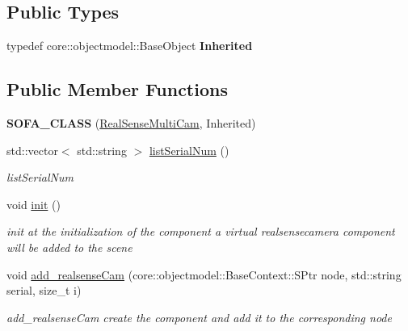 \subsection*{Public Types}
\begin{DoxyCompactItemize}
\item 
\mbox{\label{classsofa_1_1rgbdtracking_1_1_real_sense_multi_cam_ac46918355916b1af92c7aabc7e244e39}} 
typedef core\+::objectmodel\+::\+Base\+Object {\bfseries Inherited}
\end{DoxyCompactItemize}
\subsection*{Public Member Functions}
\begin{DoxyCompactItemize}
\item 
\mbox{\label{classsofa_1_1rgbdtracking_1_1_real_sense_multi_cam_a580a759696c9de476a75c1aabc955669}} 
{\bfseries S\+O\+F\+A\+\_\+\+C\+L\+A\+SS} (\hyperlink{classsofa_1_1rgbdtracking_1_1_real_sense_multi_cam}{Real\+Sense\+Multi\+Cam}, Inherited)
\item 
std\+::vector$<$ std\+::string $>$ \hyperlink{classsofa_1_1rgbdtracking_1_1_real_sense_multi_cam_ae06084e54a01de953a441b1994ad22e7}{list\+Serial\+Num} ()
\begin{DoxyCompactList}\small\item\em list\+Serial\+Num \end{DoxyCompactList}\item 
\mbox{\label{classsofa_1_1rgbdtracking_1_1_real_sense_multi_cam_ac93ba93ba4d82475f37e4300173b168d}} 
void \hyperlink{classsofa_1_1rgbdtracking_1_1_real_sense_multi_cam_ac93ba93ba4d82475f37e4300173b168d}{init} ()
\begin{DoxyCompactList}\small\item\em init at the initialization of the component a virtual realsensecamera component will be added to the scene \end{DoxyCompactList}\item 
void \hyperlink{classsofa_1_1rgbdtracking_1_1_real_sense_multi_cam_a1aea376ebf5a7ee03af4cae251380e89}{add\+\_\+realsense\+Cam} (core\+::objectmodel\+::\+Base\+Context\+::\+S\+Ptr node, std\+::string serial, size\+\_\+t i)
\begin{DoxyCompactList}\small\item\em add\+\_\+realsense\+Cam create the component and add it to the corresponding node \end{DoxyCompactList}\end{DoxyCompactItemize}
